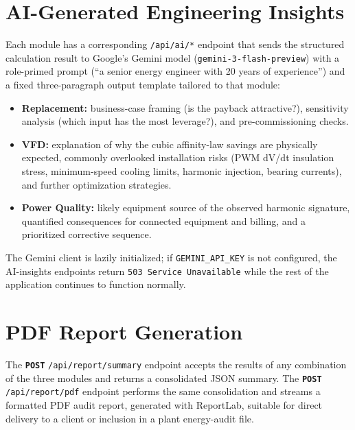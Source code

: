 \documentclass[11pt,a4paper]{article}
\newcommand{\code}[1]{\texttt{#1}}
\newcommand{\apiendpoint}[2]{\texttt{\textbf{#1}} \texttt{#2}}
\begin{document}
\section{AI-Generated Engineering Insights}

Each module has a corresponding \texttt{/api/ai/*} endpoint that sends the
structured calculation result to Google's Gemini model
(\texttt{gemini-3-flash-preview}) with a role-primed prompt (``a senior
energy engineer with 20 years of experience'') and a fixed three-paragraph
output template tailored to that module:

\begin{itemize}
    \item \textbf{Replacement:} business-case framing (is the payback
          attractive?), sensitivity analysis (which input has the most
          leverage?), and pre-commissioning checks.
    \item \textbf{VFD:} explanation of why the cubic affinity-law savings
          are physically expected, commonly overlooked installation risks
          (PWM dV/dt insulation stress, minimum-speed cooling limits,
          harmonic injection, bearing currents), and further optimization
          strategies.
    \item \textbf{Power Quality:} likely equipment source of the observed
          harmonic signature, quantified consequences for connected
          equipment and billing, and a prioritized corrective sequence.
    \end{itemize}

The Gemini client is lazily initialized; if \code{GEMINI\_API\_KEY} is not
configured, the AI-insights endpoints return \code{503 Service Unavailable}
while the rest of the application continues to function normally.

\section{PDF Report Generation}

The \apiendpoint{POST}{/api/report/summary} endpoint accepts the results of any
combination of the three modules and returns a consolidated JSON summary.
The \apiendpoint{POST}{/api/report/pdf} endpoint performs the same
consolidation and streams a formatted PDF audit report, generated with
ReportLab, suitable for direct delivery to a client or inclusion in a plant
energy-audit file.
\end{document}
